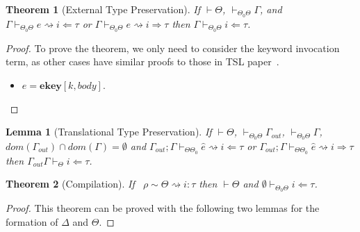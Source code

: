\documentclass{sig-alternate}
\newcommand{\myvdash}{\vdash_{\Theta}^{\Delta}}
\newtheorem{theorem}{Theorem}
\newtheorem{lemma}{Lemma}
\begin{document}
\begin{theorem}[External Type Preservation]
If $\vdash\Theta$, $\vdash_{\Theta_0\Theta}\Gamma$, and $\Gamma\vdash_{\Theta_0\Theta} e\rightsquigarrow i\Leftarrow\tau$ or $\Gamma\vdash_{\Theta_0\Theta} e\rightsquigarrow i\Rightarrow\tau$ then $\Gamma\vdash_{\Theta_0\Theta} i\Leftarrow\tau$.
\end{theorem}
\begin{proof}

To prove the theorem, we only need to consider the keyword invocation term, as other cases have similar proofs to those in TSL paper~\cite{TSLs}.
\begin{itemize}
\item $e=\mathbf{ekey}[k,body]$. 
\end{itemize} 
\end{proof}

\begin{lemma}[Translational Type Preservation]
If $\vdash\Theta$, $\vdash_{\Theta_0\Theta}\Gamma_{out}$, $\vdash_{\Theta_0\Theta}\Gamma$, $dom(\Gamma_{out})\cap dom(\Gamma)=\emptyset$ and $\Gamma_{out};\Gamma\vdash_{\Theta\Theta_0}\hat{e}\rightsquigarrow i\Leftarrow\tau$ or $\Gamma_{out};\Gamma\vdash_{\Theta\Theta_0}\hat{e}\rightsquigarrow i\Rightarrow \tau$ then $\Gamma_{out}\Gamma\vdash_{\Theta}i\Leftarrow \tau$.
\end{lemma}

\begin{theorem}[Compilation]
If ~$\rho\sim\Theta\rightsquigarrow i:\tau$ then $\vdash\Theta$ and $\emptyset\vdash_{\Theta_0\Theta} i\Leftarrow\tau$.
\end{theorem}
\begin{proof}
This theorem can be proved with the following two lemmas for the formation of $\Delta$ and $\Theta$.
\end{proof}
\end{document}
